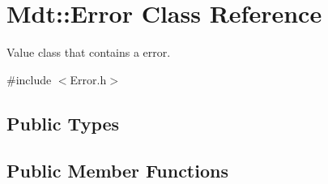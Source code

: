 \hypertarget{class_mdt_1_1_error}{}\section{Mdt\+:\+:Error Class Reference}
\label{class_mdt_1_1_error}


Value class that contains a error.  




{\ttfamily \#include $<$Error.\+h$>$}

\subsection*{Public Types}
\subsection*{Public Member Functions}
